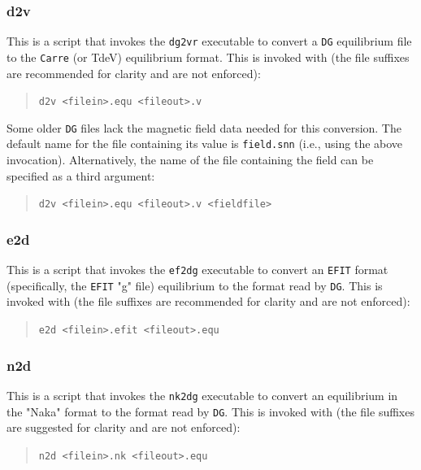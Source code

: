 \documentclass[a4paper,10pt]{report}
\begin{document}
\subsubsection{d2v}

This is a script that invokes the {\tt dg2vr}
executable to convert a
{\tt DG} equilibrium file to the {\tt Carre} (or TdeV) equilibrium
format.
This is invoked with (the file suffixes are recommended for clarity
and are not enforced):
\begin{quote}
{\tt d2v <filein>.equ <fileout>.v}
\end{quote}

Some older {\tt DG} files lack the magnetic field data needed for this conversion.
The default name for the file containing its value is
{\tt field.snn} (i.e., using the above invocation).
Alternatively, the name of the file containing the field can be
specified as a third argument:
\begin{quote}
{\tt d2v <filein>.equ <fileout>.v <fieldfile>}
\end{quote}

\subsubsection{e2d}

This is a script that invokes the {\tt ef2dg}
executable to convert an {\tt EFIT} format (specifically, the {\tt EFIT} "g" file)
equilibrium to the format read by {\tt DG}.
This is invoked with (the file suffixes are recommended for clarity
and are not enforced):
\begin{quote}
{\tt e2d <filein>.efit <fileout>.equ}
\end{quote}

\subsubsection{n2d}

This is a script that invokes the {\tt nk2dg}
executable to convert an equilibrium in the
"Naka" format
to the format read by {\tt DG}.
This is invoked with (the file suffixes are suggested for clarity
and are not enforced):
\begin{quote}
{\tt n2d <filein>.nk <fileout>.equ}
\end{quote}
\end{document}
